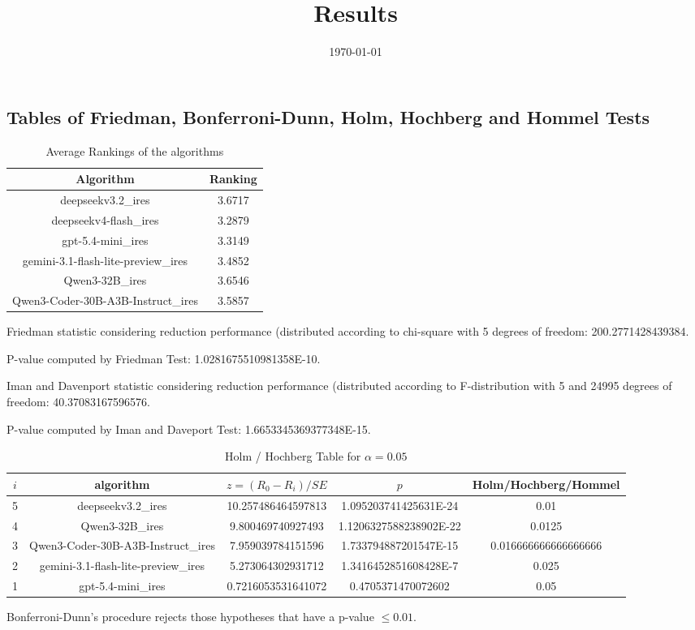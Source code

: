 \documentclass[a4paper,10pt]{article}
\title{Results}
\date{\today}
\begin{document}
\begin{landscape}
\oddsidemargin 0in \topmargin 0in\maketitle
\section{Tables of Friedman, Bonferroni-Dunn, Holm, Hochberg and Hommel Tests}
\begin{table}[!htp]
\centering
\caption{Average Rankings of the algorithms
}\begin{tabular}{c|c}
Algorithm&Ranking\\
\hline
deepseekv3.2_ires&3.6717\\
deepseekv4-flash_ires&3.2879\\
gpt-5.4-mini_ires&3.3149\\
gemini-3.1-flash-lite-preview_ires&3.4852\\
Qwen3-32B_ires&3.6546\\
Qwen3-Coder-30B-A3B-Instruct_ires&3.5857\\
\end{tabular}
\end{table}


Friedman statistic considering reduction performance (distributed according to chi-square with 5 degrees of freedom: 200.2771428439384.


P-value computed by Friedman Test: 1.0281675510981358E-10.\newline

Iman and Davenport statistic considering reduction performance (distributed according to F-distribution with 5 and 24995 degrees of freedom: 40.37083167596576.


P-value computed by Iman and Daveport Test: 1.6653345369377348E-15.\newline

\begin{table}[!htp]
\centering\tiny
\caption{Holm / Hochberg Table for $\alpha=0.05$}
\begin{tabular}{ccccc}
$i$&algorithm&$z=(R_0 - R_i)/SE$&$p$&Holm/Hochberg/Hommel\\
\hline
5&deepseekv3.2_ires&10.257486464597813&1.095203741425631E-24&0.01\\
4&Qwen3-32B_ires&9.800469740927493&1.1206327588238902E-22&0.0125\\
3&Qwen3-Coder-30B-A3B-Instruct_ires&7.959039784151596&1.733794887201547E-15&0.016666666666666666\\
2&gemini-3.1-flash-lite-preview_ires&5.273064302931712&1.3416452851608428E-7&0.025\\
1&gpt-5.4-mini_ires&0.7216053531641072&0.4705371470072602&0.05\\
\hline
\end{tabular}
\end{table}
Bonferroni-Dunn's procedure rejects those hypotheses that have a p-value $\le0.01$.



\end{landscape}
\end{document}
